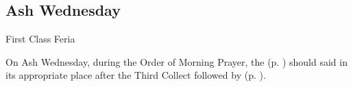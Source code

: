 \clearpage
\subsection{Ash Wednesday}
\begin{inhead}
{First Class Feria}
\end{inhead}
\par\noindent
\begin{rubric}
    On Ash Wednesday, during the Order of Morning Prayer, the  (p. \pageref{litany}) should said in its appropriate place after the Third Collect followed by  (p. \pageref{penitential}).
\end{rubric}

\vspace{-1\baselineskip}


